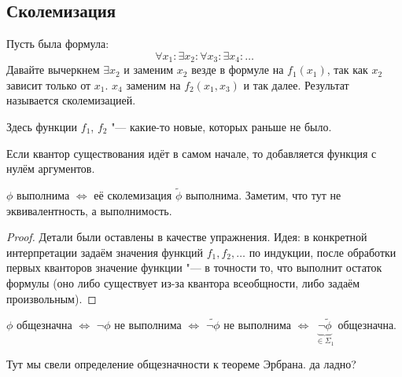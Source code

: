 \subsection{Сколемизация}
\begin{Def}
	Пусть была формула:
	\[ \forall x_1 \colon \exists x_2 \colon \forall x_3 \colon \exists x_4 \colon \dots \]
	Давайте вычеркнем $\exists x_2$ и заменим $x_2$ везде в формуле на $f_1(x_1)$,
	так как $x_2$ зависит только от $x_1$.
	$x_4$ заменим на $f_2(x_1, x_3)$ и так далее.
	Результат называется сколемизацией.

	Здесь функции $f_1$, $f_2$ "--- какие-то новые, которых раньше не было.

	Если квантор существования идёт в самом начале, то добавляется функция с нулём аргументов.
\end{Def}
\begin{assertion}
	$\phi$ выполнима $\iff$ её сколемизация $\tilde \phi$ выполнима.
	Заметим, что тут не эквивалентность, а выполнимость.
\end{assertion}
\begin{proof}
	Детали были оставлены в качестве упражнения.
	Идея: в конкретной интерпретации задаём значения функций $f_1, f_2, \dots$ по индукции, после обработки первых кванторов
	значение функции "--- в точности то, что выполнит остаток формулы (оно либо существует из-за квантора всеобщности, либо задаём произвольным).
\end{proof}
\begin{Rem}
	$\phi$ общезначна
	$\iff$ $\lnot \phi$ не выполнима
	$\iff$ $\widetilde{\lnot \phi}$ не выполнима
	$\iff$ $\underbrace{\lnot \tilde \phi}_{\in \Sigma_1}$ общезначна.

	Тут мы свели определение общезначности к теореме Эрбрана.
	\TODO да ладно?
\end{Rem}

